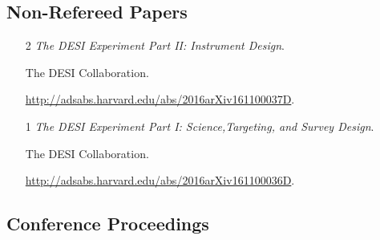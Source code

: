 \documentclass{article}
\begin{document}
\subsection{Non-Refereed Papers}

\begin{itemize}

\item[2] 
{\it The DESI Experiment Part II: Instrument Design}. 

The DESI Collaboration. 

\url{http://adsabs.harvard.edu/abs/2016arXiv161100037D}.


\item[1] 
{\it The DESI Experiment Part I: Science,Targeting, and Survey
  Design}. 

The DESI Collaboration. 

\url{http://adsabs.harvard.edu/abs/2016arXiv161100036D}.




\end{itemize}


\subsection{Conference Proceedings}
\end{document}
